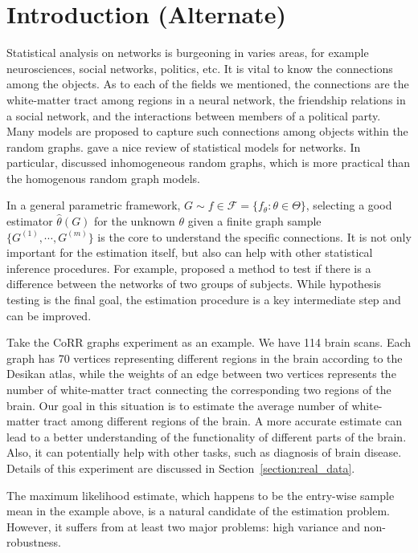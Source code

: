 \documentclass[a4paper]{article}
\renewcommand{\hat}{\widehat}
\begin{document}
\section{Introduction (Alternate)}

Statistical analysis on networks is burgeoning in varies areas, for example neurosciences, social networks, politics, etc. It is vital to know the connections among the objects. As to each of the fields we mentioned, the connections are the white-matter tract among regions in a neural network, the friendship relations in a social network, and the interactions between members of a political party. Many models are proposed to capture such connections among objects within the random graphs. \cite{goldenberg2010survey} gave a nice review of statistical models for networks. In particular, \citet{bollobas2007phase} discussed inhomogeneous random graphs, which is more practical than the homogenous random graph models.

In a general parametric framework, $G \sim f \in \mathcal{F} = \{f_{\theta} : \theta \in \Theta \}$, selecting a good estimator $\hat{\theta}(G)$ for the unknown $\theta$ given a finite graph sample $\{G^{(1)}, \cdots, G^{(m)}\}$ is the core to understand the specific connections. It is not only important for the estimation itself, but also can help with other statistical inference procedures. For example, \citet{ginestet2014hypothesis} proposed a method to test if there is a difference between the networks of two groups of subjects. While hypothesis testing is the final goal, the estimation procedure is a key intermediate step and can be improved.

Take the CoRR graphs experiment as an example. We have 114 brain scans. Each graph has 70 vertices representing different regions in the brain according to the Desikan atlas, while the weights of an edge between two vertices represents the number of white-matter tract connecting the corresponding two regions of the brain. Our goal in this situation is to estimate the average number of white-matter tract among different regions of the brain. A more accurate estimate can lead to a better understanding of the functionality of different parts of the brain. Also, it can potentially help with other tasks, such as diagnosis of brain disease. Details of this experiment are discussed in Section~\ref{section:real_data}.

The maximum likelihood estimate, which happens to be the entry-wise sample mean in the example above, is a natural candidate of the estimation problem. However, it suffers from at least two major problems: high variance and non-robustness. 
\end{document}
